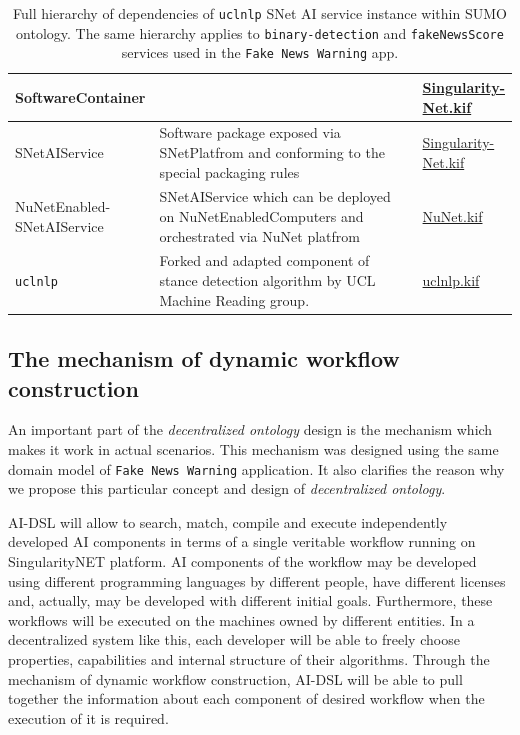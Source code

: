 \documentclass[]{report}
\begin{document}
\begin{table}[H]
\begin{tabular}{p{0.2\linewidth}|p{0.7\linewidth}|p{0.1\linewidth}|}
    \hline
    SoftwareContainer &
    &
    \href{https://github.com/singnet/ai-dsl/blob/master/ontology/
    SingulairtyNet.kif}{Singularity-Net.kif}\\
    \hline
    SNetAIService &
    Software package exposed via SNetPlatfrom and conforming to the special
    packaging rules &
    \href{https://github.com/singnet/ai-dsl/blob/master/ontology/    SingulairtyNet.kif}{Singularity-Net.kif}\\
    \hline
    NuNetEnabled-SNetAIService &
    SNetAIService which can be deployed on NuNetEnabledComputers and
    orchestrated via NuNet platfrom &
    \href{https://github.com/singnet/ai-dsl/blob/master/ontology/    NuNet.kif}{NuNet.kif}\\
    \hline
    \quad \texttt{uclnlp} &
    Forked and adapted component of stance detection algorithm by UCL Machine
    Reading group. &
    \href{https://github.com/singnet/ai-dsl/blob/master/ontology/    uclnp.kif}{uclnlp.kif}
  \end{tabular}
\captionsetup{width=0.9\linewidth}
\caption{\label{tbl:uclnlp_hierarchy}Full hierarchy of dependencies of
\texttt{uclnlp} SNet AI service instance within SUMO ontology. The same
hierarchy applies to \texttt{binary-detection} and \texttt{fakeNewsScore} services used
in the \texttt{Fake News Warning} app.}
\end{table}

\subsection{The mechanism of dynamic workflow construction}

An important part of the \textit{decentralized ontology} design is the mechanism
which makes it work in actual scenarios. This mechanism was designed using the
same domain model of \texttt{Fake News Warning} application. It also clarifies
the reason why we propose this particular concept and design of
\textit{decentralized ontology}.

AI-DSL will allow to search, match, compile and
execute independently developed AI components in terms of a single veritable
workflow running on SingularityNET platform. AI components of the workflow may
be developed using different programming languages by different people, 
have different licenses and, actually, may be developed with different initial
goals. Furthermore, these workflows will be executed on the machines owned by 
different entities. In a decentralized system like this, each developer will be
able to freely choose properties, capabilities and internal structure of their
algorithms. Through the mechanism of dynamic workflow construction, AI-DSL will
be able to pull together the information about each component of desired workflow
when the execution of it is required.
\end{document}
